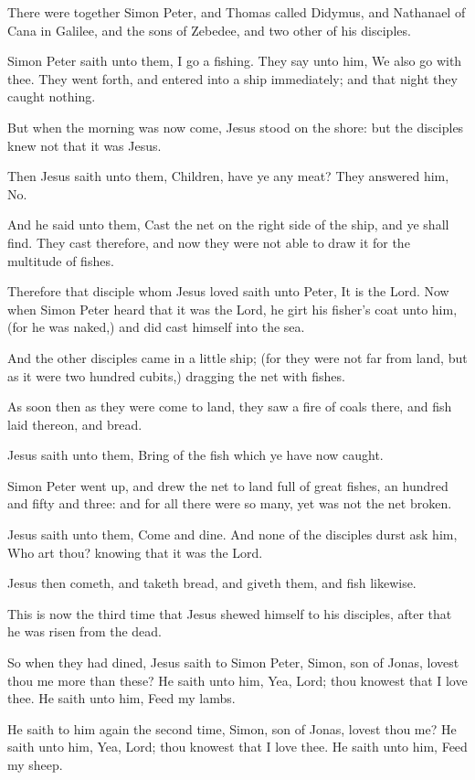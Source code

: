 \verse There were together Simon Peter, and Thomas called Didymus, and Nathanael of Cana in Galilee, and the sons of Zebedee, and two other of his disciples.

\verse Simon Peter saith unto them, I go a fishing. They say unto him, We also go with thee. They went forth, and entered into a ship immediately; and that night they caught nothing.

\verse But when the morning was now come, Jesus stood on the shore: but the disciples knew not that it was Jesus.

\verse Then Jesus saith unto them, Children, have ye any meat? They answered him, No.

\verse And he said unto them, Cast the net on the right side of the ship, and ye shall find. They cast therefore, and now they were not able to draw it for the multitude of fishes.

\verse Therefore that disciple whom Jesus loved saith unto Peter, It is the Lord. Now when Simon Peter heard that it was the Lord, he girt his fisher's coat unto him, (for he was naked,) and did cast himself into the sea.

\verse And the other disciples came in a little ship; (for they were not far from land, but as it were two hundred cubits,) dragging the net with fishes.

\verse As soon then as they were come to land, they saw a fire of coals there, and fish laid thereon, and bread.

\verse Jesus saith unto them, Bring of the fish which ye have now caught.

\verse Simon Peter went up, and drew the net to land full of great fishes, an hundred and fifty and three: and for all there were so many, yet was not the net broken.

\verse Jesus saith unto them, Come and dine. And none of the disciples durst ask him, Who art thou? knowing that it was the Lord.

\verse Jesus then cometh, and taketh bread, and giveth them, and fish likewise.

\verse This is now the third time that Jesus shewed himself to his disciples, after that he was risen from the dead.

\verse So when they had dined, Jesus saith to Simon Peter, Simon, son of Jonas, lovest thou me more than these? He saith unto him, Yea, Lord; thou knowest that I love thee. He saith unto him, Feed my lambs.

\verse He saith to him again the second time, Simon, son of Jonas, lovest thou me? He saith unto him, Yea, Lord; thou knowest that I love thee. He saith unto him, Feed my sheep.

